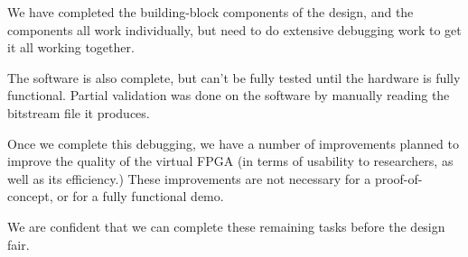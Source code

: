 
We have completed the building-block components of the design, and the components all work individually, but need to do extensive debugging work to get it all working together.

The software is also complete, but can't be fully tested until the hardware is fully functional.
Partial validation was done on the software by manually reading the bitstream file it produces.

Once we complete this debugging, we have a number of improvements planned to improve the quality of the virtual FPGA (in terms of usability to researchers, as well as its efficiency.)
These improvements are not necessary for a proof-of-concept, or for a fully functional demo.

We are confident that we can complete these remaining tasks before the design fair.



